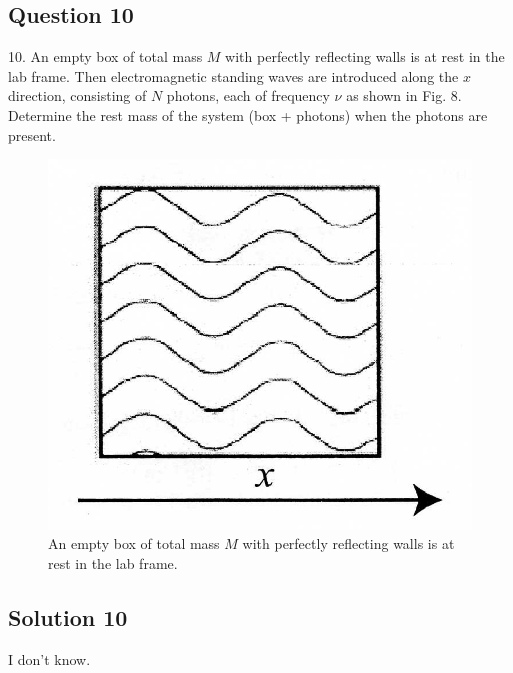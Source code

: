 \documentclass{article}
\begin{document}
\subsection{Question 10}
10. An empty box of total mass $M$ with perfectly reflecting walls is at rest in the lab frame. Then electromagnetic standing waves are introduced along the $x$ direction, consisting of $N$ photons, each of frequency $\nu$ as shown in Fig. 8. Determine the rest mass of the system (box + photons) when the photons are present.
\begin{figure}
	\centering
	\includegraphics[width=0.5\linewidth]{spho_book_TYS_images/2010q10.png}
	\caption{An empty box of total mass $M$ with perfectly reflecting walls is at rest in the lab frame.}
\end{figure}
\subsection{Solution 10}
I don't know.
\end{document}
